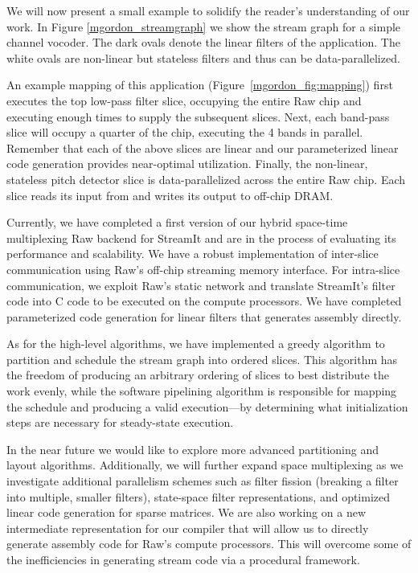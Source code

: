 \documentclass{csailabstractbook}
\begin{document}
We will now present a small example to solidify the reader's
understanding of our work.  In Figure \ref{mgordon_streamgraph} we show the
stream graph for a simple channel vocoder.  The dark ovals denote the
linear filters of the application.  The white ovals are non-linear but
stateless filters and thus can be data-parallelized.

An example mapping of this application (Figure~\ref{mgordon_fig:mapping})
first executes the top low-pass filter slice, occupying the entire Raw
chip and executing enough times to supply the subsequent slices. Next,
each band-pass slice will occupy a quarter of the chip, executing the
4 bands in parallel.  Remember that each of the above slices are
linear and our parameterized linear code generation provides
near-optimal utilization. Finally, the non-linear, stateless pitch
detector slice is data-parallelized across the entire Raw chip. Each
slice reads its input from and writes its output to off-chip DRAM.
 
Currently, we have completed a first version of our hybrid space-time
multiplexing Raw backend for StreamIt and are in the process of
evaluating its performance and scalability.  We have a robust
implementation of inter-slice communication using Raw's off-chip
streaming memory interface.  For intra-slice communication, we exploit
Raw's static network and translate StreamIt's filter code into C
code to be executed on the compute processors.  We have completed
parameterized code generation for linear filters that generates
assembly directly.  
 
As for the high-level algorithms, we have implemented a greedy
algorithm to partition and schedule the stream graph into ordered slices.
This algorithm has the freedom of producing an arbitrary ordering of slices
to best distribute the work evenly, while the software
pipelining algorithm is responsible for mapping the schedule and
producing a valid execution---by determining what initialization steps
are necessary for steady-state execution.


In the near future we would like to explore more advanced partitioning
and layout algorithms.  Additionally, we will further expand space
multiplexing as we investigate additional parallelism schemes such as
filter fission (breaking a filter into multiple, smaller filters),
state-space filter representations, and optimized linear code
generation for sparse matrices.  We are also working on a new
intermediate representation for our compiler that will allow us to
directly generate assembly code for Raw's compute
processors. This will overcome some of the inefficiencies in generating
stream code via a procedural framework.
\end{document}
